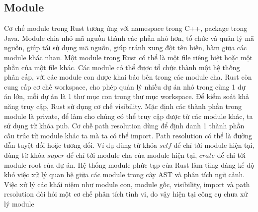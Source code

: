 \subsection{Module}

Cơ chế module trong Rust tương ứng với namespace trong C++, package trong Java. Module chia nhỏ mã nguồn thành các phần nhỏ hơn, tổ chức và quản lý mã nguồn, giúp tái sử dụng mã nguồn, giúp tránh xung đột tên biến, hàm giữa các module khác nhau.
Một module trong Rust có thể là một file riêng biệt hoặc một phần của một file khác. Các module có thể được tổ chức thành một hệ thống phân cấp, với các module con được khai báo bên trong các module cha.
Rust còn cung cấp cơ chế workspace, cho phép quản lý nhiều dự án nhỏ trong cùng 1 dự án lớn, mỗi dự án là 1 thư mục con trong thư mục workspace.
Để kiểm soát khả năng truy cập, Rust sử dụng cơ chế visibility. Mặc định các thành phần trong module là private, để làm cho chúng có thể truy cập được từ các module khác, ta sử dụng từ khóa pub.
Cơ chế path resolution dùng để định danh 1 thành phần cấu trúc từ module khác ta mà ta có thể import. Path resolution có thể là đường dẫn tuyệt đối hoặc tương đối. Ví dụ dùng từ khóa $self$ để chỉ tới module hiện tại, dùng từ khóa $super$ để chỉ tới module cha của module hiện tại, $crate$ để chỉ tới module root của dự án.
Hệ thống module phức tạp của Rust làm tăng đáng kể độ khó việc xử lý quan hệ giữa các module trong cây AST và phân tích ngữ cảnh.
Việc xử lý các khái niệm như module con, module gốc, visibility, import và path resolution đòi hỏi một cơ chế phân tích tinh vi, do vậy hiện tại công cụ chưa xử lý module



